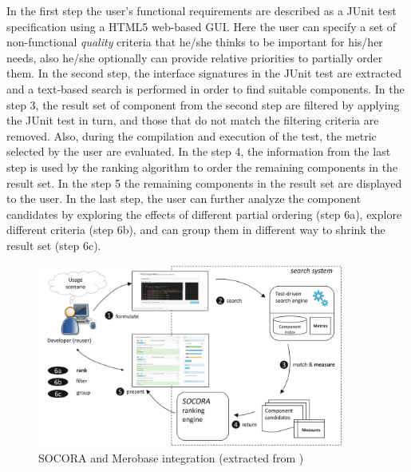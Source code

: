 In the first step the user's functional requirements are described as a JUnit test specification using a HTML5 web-based GUI. Here the user can specify a set of non-functional \textit{quality} criteria that he/she thinks to be important for his/her needs, also he/she optionally can provide relative priorities to partially order them. In the second step, the interface signatures in the JUnit test are extracted and a text-based search is performed in order to find suitable components. In the step 3, the result set of component from the second step are filtered by applying the JUnit test in turn, and those that do not match the filtering criteria are removed. Also, during the compilation and execution of the test, the metric selected by the user are evaluated. In the step 4, the information from the last step is used by the ranking algorithm to order the remaining components in the result set. In the step 5 the remaining components in the result set are displayed to the user. In the last step, the user can further analyze the component candidates by exploring the effects of different partial ordering (step 6a), explore different criteria (step 6b), and can group them in different way to shrink the result set (step 6c).

\begin{figure}[hb]
	\centering
    \includegraphics[width=0.9\textwidth]{grafiken/socora-merobase}
    \caption{SOCORA and Merobase integration (extracted from \cite{Kessel2016})}
    \label{fig:socora-merobase}
\end{figure}